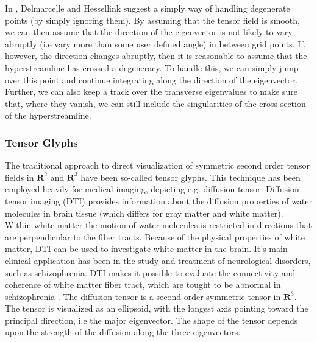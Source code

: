 \documentclass[main.tex]{subfiles}
\begin{document}
In \cite{DH93}, Delmarcelle and Hessellink suggest a simply way of handling degenerate 
points (by simply ignoring them). By assuming that the tensor field is smooth, we can then assume 
that the direction of the eigenvector is not likely to vary abruptly (i.e vary more than some 
user defined angle) in between grid points. If, however, the direction changes abruptly, then 
it is reasonable to assume that the hyperstreamline has crossed a degeneracy. To handle this, we 
can simply jump over this point and continue integrating along the direction of the eigenvector. 
Further, we can also keep a track over the transverse eigenvalues to make sure that, where they 
vanish, we can still include the singularities of the cross-section of the hyperstreamline.


\subsubsection{Tensor Glyphs}
The traditional approach to direct visualization of symmetric second order tensor fields
in $\mathbf{R}^2$ and $\mathbf{R}^3$ have been so-called tensor glyphs. This technique 
has been employed heavily for medical imaging, depicting e.g. \hspace{-1mm}diffusion
tensor. Diffusion tensor imaging (DTI) provides information about the diffusion properties 
of water molecules in brain tissue (which differs for gray matter and white matter). Within 
white matter the motion of water molecules is restricted in directions that are perpendicular 
to the fiber tracts. Because of the physical properties of white matter, DTI can be used 
to investigate white matter in the brain. It's main clinical application has been in the 
study and treatment of neurological disorders, such as schizophrenia. DTI makes it 
possible to evaluate the connectivity and coherence of white matter fiber tract, which are 
tought to be abnormal in schizophrenia \cite{KMW05}. The diffusion tensor is a second 
order symmetric tensor in $\mathbf{R}^3$. The tensor is visualized as an ellipsoid, with 
the longest axis pointing toward the principal direction, i.e the major eigenvector. The 
shape of the tensor depends upon the strength of the diffusion along the three 
eigenvectors.
\end{document}
